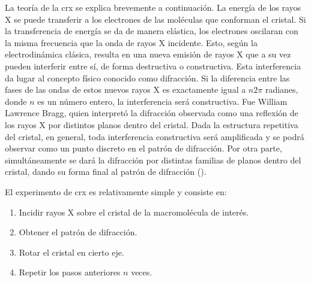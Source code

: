 La teoría de la \acrshort{crx} se explica brevemente a continuación. La energía de los rayos X se puede transferir a los electrones de las moléculas que conforman el cristal. Si la transferencia de energía se da de manera elástica, los electrones oscilaran con la misma frecuencia que la onda de rayos X incidente. Esto, según la electrodinámica clásica, resulta en una nueva emisión de rayos X que a su vez pueden interferir entre sí, de forma destructiva o constructiva. Esta interferencia da lugar al concepto físico conocido como difracción. Si la diferencia entre las fases de las ondas de estos nuevos rayos X es exactamente igual a $n2\pi$ radianes, donde $n$ es un número entero, la interferencia será constructiva. Fue William Lawrence Bragg, quien interpretó la difracción observada como una reflexión de los rayos X por distintos planos dentro del cristal.
Dada la estructura repetitiva del cristal, en general, toda interferencia constructiva será amplificada y se podrá observar como un punto discreto en el patrón de difracción. Por otra parte, simultáneamente se dará la difracción por distintas familias de planos dentro del cristal, dando su forma final al patrón de difracción (). 


El experimento de \acrshort{crx} es relativamente simple y consiste en:

\begin{enumerate}
	\item Incidir rayos X sobre el cristal de la macromolécula de interés. 
	\item Obtener el patrón de difracción. 
	\item Rotar el cristal en cierto eje. 
	\item Repetir los pasos anteriores $n$ veces.
\end{enumerate}

